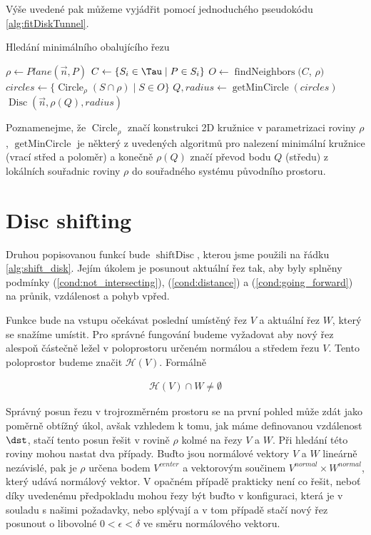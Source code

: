 Výše uvedené pak můžeme vyjádřit pomocí jednoduchého pseudokódu \ref{alg:fitDiskTunnel}.

\begin{algorithm}
\caption{Hledání minimálního obalujícího řezu}
\label{alg:fitDiskTunnel}
\begin{algorithmic}[1]

    \State $ \rho \gets Plane(\vec{n}, P) $
    \State $ C \gets \{S_i \in \Tau \mid P \in S_i \} $
    \State $ O \gets \operatorname{findNeighbors}(C$, $\rho)$
    \State $ circles \gets \{ \operatorname{Circle}_{\rho}(S \cap \rho) \mid S \in O \} $
    \State $ Q, radius \gets \operatorname{getMinCircle}(circles) $
    \State \Return $ \operatorname{Disc}(\vec{n}, \rho(Q), radius) $
\EndFunction

\end{algorithmic}
\end{algorithm}
Poznamenejme, že $ \operatorname{Circle}_{\rho} $ značí konstrukci 2D kružnice
v parametrizaci roviny $ \rho $, $ \operatorname{getMinCircle} $ je některý z
uvedených algoritmů pro nalezení minimální kružnice (vrací střed a poloměr)
a konečně $ \rho(Q) $ značí převod bodu $ Q $ (středu) z lokálních souřadnic
roviny $ \rho $ do souřadného systému původního prostoru.



\section{Disc shifting} \label{subsec:disk_shift}
Druhou popisovanou funkcí bude $ \operatorname{shiftDisc} $, kterou jsme použili
na řádku \ref{alg:shift_disk}. Jejím úkolem je posunout aktuální řez tak, aby
byly splněny podmínky (\ref{cond:not_intersecting}), (\ref{cond:distance})
a (\ref{cond:going_forward}) na průnik, vzdálenost a pohyb vpřed.

Funkce bude na vstupu očekávat poslední umístěný řez $ V $ a aktuální řez $ W $,
který se snažíme umístit. Pro správné fungování budeme vyžadovat aby nový řez
alespoň částečně ležel v poloprostoru určeném normálou a středem řezu $ V $.
Tento poloprostor budeme značit $ \mathcal{H}(V) $. Formálně

\begin{align} \label{cond:halfspace}
    \mathcal{H}(V) \cap W \neq \emptyset
\end{align}

Správný posun řezu v trojrozměrném prostoru se na první pohled může zdát jako
poměrně obtížný úkol, avšak vzhledem k tomu, jak máme definovanou vzdálenost $ \dst $,
stačí tento posun řešit v rovině $ \rho $ kolmé na řezy $ V $ a $ W $. Při hledání této
roviny mohou nastat dva případy. Buďto jsou normálové vektory $ V $ a $ W $ lineárně
nezávislé, pak je $ \rho $ určena bodem $ V^{center} $ a vektorovým součinem
$ V^{normal} \times W^{normal} $, který udává normálový vektor. V opačném případě
prakticky není co řešit, neboť díky uvedenému předpokladu mohou řezy být buďto
v konfiguraci, která je v souladu s našimi požadavky, nebo splývají a v tom
případě stačí nový řez posunout o libovolné $ 0 < \epsilon < \delta $ ve směru
normálového vektoru.

